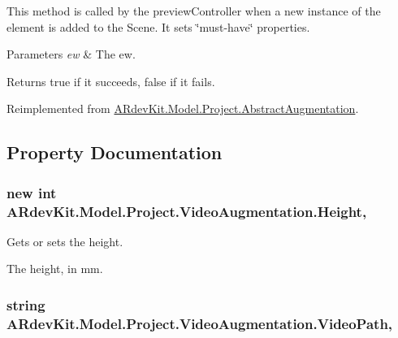 This method is called by the preview\-Controller when a new instance of the element is added to the Scene. It sets \char`\"{}must-\/have\char`\"{} properties. 


\begin{DoxyParams}{Parameters}
{\em ew} & The ew.\\
\hline
\end{DoxyParams}
\begin{DoxyReturn}{Returns}
true if it succeeds, false if it fails. 
\end{DoxyReturn}


Reimplemented from \hyperlink{class_a_rdev_kit_1_1_model_1_1_project_1_1_abstract_augmentation_a8b02a2eb775b8147e71575694ce8a38f}{A\-Rdev\-Kit.\-Model.\-Project.\-Abstract\-Augmentation}.



\subsection{Property Documentation}
\hypertarget{class_a_rdev_kit_1_1_model_1_1_project_1_1_video_augmentation_accd9c0cc7875d689b73306a38892b4fe}{
\subsubsection[{Height}]{\setlength{\rightskip}{0pt plus 5cm}new int A\-Rdev\-Kit.\-Model.\-Project.\-Video\-Augmentation.\-Height\hspace{0.3cm}{\ttfamily [get]}, {\ttfamily [set]}}}\label{class_a_rdev_kit_1_1_model_1_1_project_1_1_video_augmentation_accd9c0cc7875d689b73306a38892b4fe}


Gets or sets the height. 

The height, in mm. \hypertarget{class_a_rdev_kit_1_1_model_1_1_project_1_1_video_augmentation_adf603b3ae112358e8cae761e94003de1}{
\subsubsection[{Video\-Path}]{\setlength{\rightskip}{0pt plus 5cm}string A\-Rdev\-Kit.\-Model.\-Project.\-Video\-Augmentation.\-Video\-Path\hspace{0.3cm}{\ttfamily [get]}, {\ttfamily [set]}}}\label{class_a_rdev_kit_1_1_model_1_1_project_1_1_video_augmentation_adf603b3ae112358e8cae761e94003de1}



